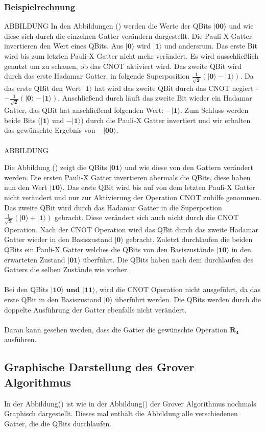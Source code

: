 \subsubsection{Beispielrechnung}
ABBILDUNG
 In den Abbildungen () werden die Werte der QBits $\mathbf{|00\rangle}$ und wie diese sich durch die einzelnen Gatter verändern dargestellt.
 Die Pauli X Gatter invertieren den Wert eines QBits. Aus $\mathbf{|0\rangle}$ wird $\mathbf{|1\rangle}$ und andersrum. Das erste Bit wird bis zum letzten Pauli-X Gatter nicht mehr verändert. Es wird ausschließlich genutzt um zu schauen, ob das CNOT aktiviert wird. Das zweite QBit wird durch das erste Hadamar Gatter, in folgende Superposition $\mathbf{\frac{1}{\sqrt 2}(|0\rangle - |1\rangle)}$. Da das erste QBit den Wert $\mathbf{|1\rangle}$ hat wird das zweite QBit durch das CNOT negiert - $\mathbf{-\frac{1}{\sqrt 2}(|0\rangle - |1\rangle)}$. Anschließend durch läuft das zweite Bit wieder ein Hadamar Gatter, das QBit hat anschließend folgenden Wert: $\mathbf{-|1\rangle}$.
 Zum Schluss werden beide Bits ($\mathbf{|1\rangle}$ und $\mathbf{-|1\rangle}$) durch die Pauli-X Gatter invertiert und wir erhalten das gewünschte Ergebnis von $\mathbf{-|00\rangle}$.
  \\
  \\
  ABBILDUNG

 Die Abbildung () zeigt die QBits $\mathbf{|01\rangle}$  und wie diese von den Gattern verändert werden. Die ersten Pauli-X Gatter invertieren abermals die QBits, diese haben nun den Wert $\mathbf{|10\rangle}$. Das erste QBit wird bis auf von dem letzten Pauli-X Gatter nicht verändert und nur zur Aktivierung der Operation CNOT zuhilfe genommen. Das zweite QBit wird durch das Hadamar Gatter in die Superpostion $\mathbf{\frac{1}{\sqrt 2}(|0\rangle + |1\rangle)}$ gebracht. Diese verändert sich auch nicht durch die CNOT Operation. Nach der CNOT Operation wird das QBit durch das zweite Hadamar Gatter wieder in den Basiszustand $\mathbf{|0\rangle}$ gebracht. Zuletzt durchlaufen die beiden QBits ein Pauli-X Gatter welches die QBits von den Basiszustände $\mathbf{|10\rangle}$ in den erwarteten Zustand $\mathbf{|01\rangle}$ überführt. Die QBits haben nach dem durchlaufen des Gatters die selben Zustände wie vorher.
  \\ 
  \\
Bei den QBits $\mathbf{|10\rangle \text{ und }|11\rangle}$, wird die CNOT Operation nicht ausgeführt, da das erste QBit in den Basiszustand $\mathbf{|0\rangle}$ überführt werden. Die QBits werden durch die doppelte Ausführung der Gatter ebenfalls nicht verändert.
\\
\\
Daran kann gesehen werden, dass die Gatter die gewünschte Operation $\mathbf{R_4}$ ausführen.

\subsection{Graphische Darstellung des Grover Algorithmus}
In der Abbildung() ist wie in der Abbildung() der Grover Algorithmus nochmals Graphisch dargestellt. Dieses mal enthält die Abbildung alle verschiedenen Gatter, die die QBits durchlaufen.



